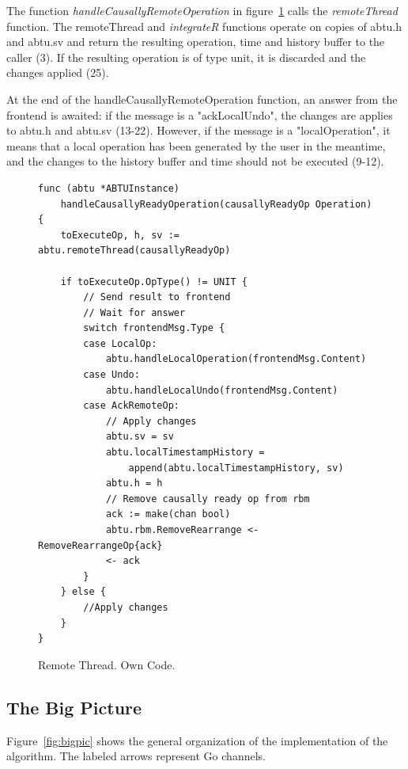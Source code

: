 \documentclass[11pt, a4paper, oneside, openright]{article} %
\begin{document}
The function \textit{handleCausallyRemoteOperation} in figure~\ref{code:remote} calls the \textit{remoteThread} function. The remoteThread and \textit{integrateR} functions operate on copies of abtu.h and abtu.sv and return the resulting operation, time and history buffer to the caller (3). If the resulting operation is of type unit, it is discarded and the changes applied (25).

At the end of the handleCausallyRemoteOperation function, an answer from the frontend is awaited: if the message is a "ackLocalUndo", the changes are applies to abtu.h and abtu.sv (13-22). However, if the message is a "localOperation", it means that a local operation has been generated by the user in the meantime, and the changes to the history buffer and time should not be executed (9-12).

\begin{figure}[!h]
\begin{center}
\begin{lstlisting}
func (abtu *ABTUInstance)
	handleCausallyReadyOperation(causallyReadyOp Operation){
	toExecuteOp, h, sv := abtu.remoteThread(causallyReadyOp)

	if toExecuteOp.OpType() != UNIT {
		// Send result to frontend
		// Wait for answer
		switch frontendMsg.Type {
		case LocalOp:
			abtu.handleLocalOperation(frontendMsg.Content)
		case Undo:
			abtu.handleLocalUndo(frontendMsg.Content)
		case AckRemoteOp:
			// Apply changes
			abtu.sv = sv
			abtu.localTimestampHistory =
				append(abtu.localTimestampHistory, sv)
			abtu.h = h
			// Remove causally ready op from rbm
			ack := make(chan bool)
			abtu.rbm.RemoveRearrange <- RemoveRearrangeOp{ack}
			<- ack
		}
	} else {
		//Apply changes
	}
}
\end{lstlisting}
\end{center}
\caption{Remote Thread. Own Code.\label{code:remote}}
\end{figure}

\subsection{The Big Picture}

Figure~\ref{fig:bigpic} shows the general organization of the implementation of the algorithm. The labeled arrows represent Go channels.
\end{document}
